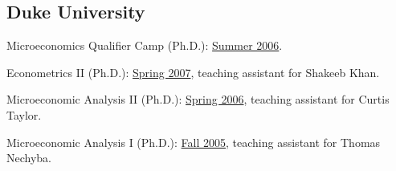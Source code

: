 \documentclass[10pt,letterpaper]{article}
\renewenvironment{itemize}{
  \begin{list}{}{
      \setlength{\leftmargin}{1.5em}
      \setlength{\itemsep}{0.25em}
      \setlength{\parskip}{0pt}
      \setlength{\parsep}{0.25em}
    }
}{
  \end{list}
}
\begin{document}
\subsection*{Duke University}

\begin{itemize}
\item Microeconomics Qualifier Camp (Ph.D.):
  \href{https://jblevins.org/courses/qualcamp06/}{Summer 2006}.
\item Econometrics II (Ph.D.):
  \href{https://jblevins.org/courses/econ342s07/}{Spring 2007}, teaching assistant for Shakeeb Khan.
\item Microeconomic Analysis II (Ph.D.):
  \href{https://jblevins.org/courses/econ302s06/}{Spring 2006}, teaching assistant for Curtis Taylor.
\item Microeconomic Analysis I (Ph.D.):
  \href{https://jblevins.org/courses/econ301f05/}{Fall 2005}, teaching assistant for Thomas Nechyba.
\end{itemize}


\end{document}
